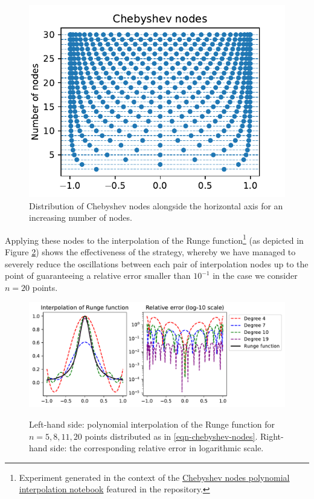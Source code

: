 \documentclass[12pt]{report} %
\begin{document}
\begin{figure}[ht]
    \centering
    \includegraphics[width=.5\textwidth]{imagenes/polynomial_interpolation/Chebyshev_Nodes.pdf}
    \caption{Distribution of Chebyshev nodes alongside the horizontal axis for an increasing number of nodes.}
    \label{fig:chebyshev-nodes}
\end{figure}



Applying these nodes to the
interpolation of the Runge function\footnote{Experiment generated in the context of the \href{https://github.com/heqro/tfm-experiments/blob/main/introductory_notebooks/polynomial_interpolation/runge_chebyshev.ipynb}{Chebyshev nodes polynomial interpolation notebook} featured in the repository.} (as depicted in Figure
\ref{fig:runge-polynomial-cheb}) shows the effectiveness of the strategy,
whereby we have managed to severely reduce the oscillations between each pair
of interpolation nodes up to the point of guaranteeing a relative error
smaller than $10^{- 1}$ in the case we consider $n = 20$ points. 

\begin{figure}[ht]
    \centering
    {\includegraphics[width=\textwidth]{imagenes/polynomial_interpolation/Runge_Polynomial_Cheb.pdf}}
    \caption{Left-hand side: polynomial interpolation of the Runge function for $n=5, 8, 11, 20$ points distributed as in \eqref{eqn-chebyshev-nodes}. Right-hand side: the corresponding relative error in logarithmic scale.}
    \label{fig:runge-polynomial-cheb}
\end{figure}
\end{document}
